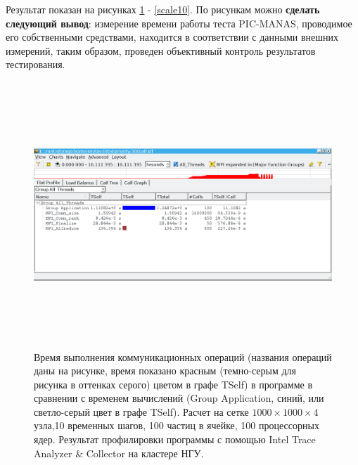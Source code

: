 	   
	    Результат показан на рисунках \ref{scale9} - \ref{scale10}. По рисункам можно \textbf{сделать следующий вывод}: измерение времени работы теста PIC-MANAS, проводимое его собственными средствами, находится в соответствии с данными внешних измерений, таким образом, проведен объективный контроль результатов тестирования.
	    
\begin{figure}[h]
	\begin{center}
		\includegraphics[height=10cm,keepaspectratio]{images/scalingNSU-img18.png}
		\caption{
		 Время выполнения коммуникационных операций (названия операций даны на рисунке, время показано красным (темно-серым для рисунка в оттенках серого) цветом в графе TSelf) в программе в сравнении с временем вычислений (Group Application, синий, или светло-серый цвет в графе TSelf). Расчет на сетке $1000\times1000\times4$ узла,10 временных шагов, 100 частиц в ячейке,  100 процессорных ядер. Результат профилировки программы с помощью Intel Trace Analyzer \& Collector на кластере НГУ.
		}
		\label{scale9}
	\end{center} 
\end{figure}	    
	   
